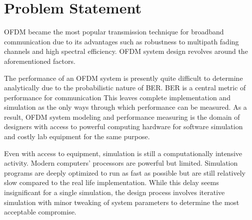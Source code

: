 
\section{Problem Statement}
\gls{OFDM} became the most popular transmission technique for broadband communication due to its advantages such as robustness to multipath fading channels and high spectral efficiency\cite{wireless_design}. \gls{OFDM} system design revolves around the aforementioned factors.

The performance of an \gls{OFDM} system is presently quite difficult to determine analytically due to the probabilistic nature of \gls{BER}. \gls{BER} is a central metric of performance for communication This leaves complete implementation and simulation as the only ways through which performance can be measured. As a result, \gls{OFDM} system modeling and performance measuring is the domain of designers with access to powerful computing hardware for software simulation and costly lab equipment for the same purpose.

Even with access to equipment, simulation is still a computationally intensive activity. Modern computers' processors are powerful but limited. Simulation programs are deeply optimized to run as fast as possible but are still relatively slow compared to the real life implementation. While this delay seems insignificant for a single simulation, the design process involves iterative simulation with minor tweaking of system parameters to determine the most acceptable compromise.
 

